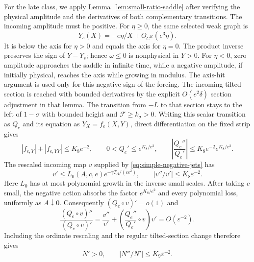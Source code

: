 For the late class, we apply Lemma~\ref{lem:small-ratio-saddle}
after verifying the physical amplitude and the derivatives of both
complementary transitions. The incoming amplitude must be positive.
For $\eta\ge0$, the same selected weak graph is
\[
 Y_s(X)=-e\eta/X+O_{C^K}(e^3\eta).
\]
It is below the axis for $\eta>0$ and equals the axis for $\eta=0$.
The product inverse preserves the sign of $Y-Y_s$; hence
$\omega\le0$ is nonphysical in $Y>0$. For $\eta<0$, zero amplitude
approaches the saddle in infinite time, while a negative amplitude,
if initially physical, reaches the axis while growing in modulus.
The axis-hit argument is used only for this negative sign of the forcing.
The incoming tilted section is reached with bounded derivatives by
the explicit $O(e^2\delta)$ section adjustment in that lemma.
The transition from $-L$ to that section stays to the left of
$1-\sigma$ with bounded height and $\mathcal F\ge k_\sigma>0$.
Writing this scalar transition as $Q_e$ and its equation as
$Y_X=f_e(X,Y)$, direct differentiation on the fixed strip gives
\[
 |f_{e,Y}|+|f_{e,YY}|\le K_8e^{-2},\qquad
 0<Q_e'\le e^{K_8/e^2},\qquad
 \left|\frac{Q_e''}{Q_e'}\right|
       \le K_8e^{-2}e^{K_8/e^2}.
\]
The rescaled incoming map $v$ supplied by
\eqref{eq:simple-negative-jets} has
\[
 v'\le L_0(A,c,e)e^{-\gamma T_A/(ce^2)},\qquad
 |v''/v'|\le K_8\varepsilon^{-2}.
\]
Here $L_0$ has at most polynomial growth in the inverse small scales.
After taking $c$ small, the negative action absorbs the factor
$e^{K_8/e^2}$ and every polynomial loss, uniformly as $A\downarrow0$.
Consequently $(Q_e\circ v)'=o(1)$ and
\[
 \frac{(Q_e\circ v)''}{(Q_e\circ v)'}
 =\frac{v''}{v'}+\left(\frac{Q_e''}{Q_e'}\circ v\right)v'
 =O(\varepsilon^{-2}).
\]
Including the ordinate rescaling and the regular tilted-section change
therefore gives
\begin{equation}\label{eq:simple-small-ratio-negative}
 N'>0,\qquad |N''/N'|\le K_9\varepsilon^{-2}.
\end{equation}

